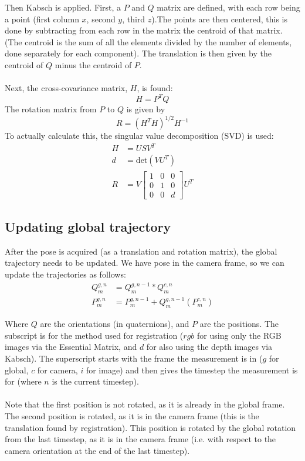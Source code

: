 \documentclass[12pt,a4paper]{article}
\begin{document}
Then Kabsch is applied. First, a $P$ and $Q$ matrix are defined, with each row being a point (first column $x$, second $y$, third $z$).The points are then centered, this is done by subtracting from each row in the matrix the centroid of that matrix. (The centroid is the sum of all the elements divided by the number of elements, done separately for each component). The translation is then given by the centroid of $Q$ minus the centroid of $P$.
\\\\
Next, the cross-covariance matrix, $H$, is found:
\[
H = P^T Q
\]
The rotation matrix from $P$ to $Q$ is given by 
\[
R = (H^TH)^{1/2}H^{-1}
\]
To actually calculate this, the singular value decomposition (SVD) is used:
\begin{align*}
H &= USV^T \\
d &= \text{det}(VU^T) \\
R &= V \begin{bmatrix} 1 & 0 & 0 \\ 0 & 1 & 0 \\ 0 & 0 & d \end{bmatrix} U^T
\end{align*}

\subsection{Updating global trajectory}
After the pose is acquired (as a translation and rotation matrix), the global trajectory needs to be updated. We have pose in the camera frame, so we can update the trajectories as follows:
\begin{align*}
Q_{m}^{g,n} &= Q_{m}^{g,n-1} * Q_{m}^{c,n} \\
P_{m}^{g,n} &= P_{m}^{g,n-1} + Q_{m}^{g,n-1}(P_{m}^{c,n})
\end{align*}

\noindent
Where $Q$ are the orientations (in quaternions), and $P$ are the positions. The subscript is for the method used for registration ($rgb$ for using only the RGB images via the Essential Matrix, and $d$ for also using the depth images via Kabsch). The superscript starts with the frame the measurement is in ($g$ for global, $c$ for camera, $i$ for image) and then gives the timestep the measurement is for (where $n$ is the current timestep).
\\\\
Note that the first position is not rotated, as it is already in the global frame. The second position is rotated, as it is in the camera frame (this is the translation found by registration). This position is rotated by the global rotation from the last timestep, as it is in the camera frame (i.e. with respect to the camera orientation at the end of the last timestep).




\end{document}
